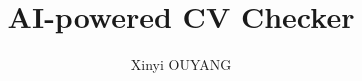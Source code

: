 \documentclass[12pt,MSc,wordcount,twoside,anon]{muthesis}
\begin{document}

\title{AI-powered CV Checker}
\author{Xinyi OUYANG}

\beforeabstract



\afterabstract








%
%
%



% 
% 


\appendix
% 
% 
\end{document}
